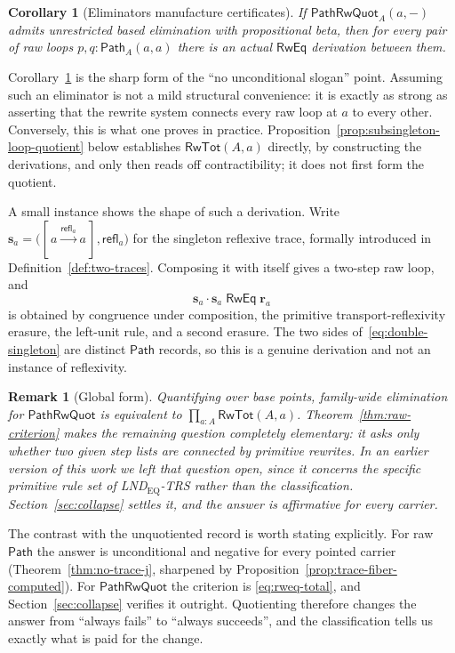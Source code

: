 \documentclass[10pt,reqno]{amsart}
\newtheorem{corollary}[theorem]{Corollary}
\newtheorem{remark}[theorem]{Remark}
\newcommand{\RwTot}{\mathsf{RwTot}}
\newcommand{\PathTy}{\mathsf{Path}}
\newcommand{\refl}{\mathsf{refl}}
\newcommand{\PRW}{\mathsf{PathRwQuot}}
\begin{document}
\begin{corollary}[Eliminators manufacture certificates]
\label{cor:eliminator-certificates}
If \(\PRW_A(a,-)\) admits unrestricted based elimination with propositional
beta, then for every pair of raw loops \(p,q:\PathTy_A(a,a)\) there is an
actual \(\mathsf{RwEq}\) derivation between them.
\end{corollary}

Corollary~\ref{cor:eliminator-certificates} is the sharp form of the ``no
unconditional slogan'' point.  Assuming such an eliminator is not a mild
structural convenience: it is exactly as strong as asserting that the rewrite
system connects every raw loop at \(a\) to every other.  Conversely, this is
what one proves in practice.  Proposition~\ref{prop:subsingleton-loop-quotient}
below establishes \(\RwTot(A,a)\) directly, by constructing the derivations, and
only then reads off contractibility; it does not first form the quotient.

A small instance shows the shape of such a derivation.  Write
\(\mathbf s_a=\bigl([\,a\xrightarrow{\refl_a}a\,],\refl_a\bigr)\) for the
singleton reflexive trace, formally introduced in
Definition~\ref{def:two-traces}.  Composing it with itself gives a two-step raw
loop, and
\[
 \mathbf s_a\cdot\mathbf s_a
 \;\mathrel{\mathsf{RwEq}}\;
 \mathbf r_a
\tag{10.9}\label{eq:double-singleton}
\]
is obtained by congruence under composition, the primitive
transport-reflexivity erasure, the left-unit rule, and a second erasure.  The
two sides of~\eqref{eq:double-singleton} are distinct \(\PathTy\) records, so
this is a genuine derivation and not an instance of reflexivity.

\begin{remark}[Global form]
\label{rem:raw-global}
Quantifying over base points, family-wide elimination for \(\PRW\) is
equivalent to \(\prod_{a:A}\RwTot(A,a)\).  Theorem~\ref{thm:raw-criterion}
makes the remaining question completely elementary: it asks only whether two
given step lists are connected by primitive rewrites.  In an earlier version of
this work we left that question open, since it concerns the specific primitive
rule set of LND\(_{\mathrm{EQ}}\)-TRS rather than the classification.
Section~\ref{sec:collapse} settles it, and the answer is affirmative for every
carrier.
\end{remark}

The contrast with the unquotiented record is worth stating explicitly.  For raw
\(\PathTy\) the answer is unconditional and negative for every pointed carrier
(Theorem~\ref{thm:no-trace-j}, sharpened by
Proposition~\ref{prop:trace-fiber-computed}).  For \(\PRW\) the criterion is
\eqref{eq:rweq-total}, and Section~\ref{sec:collapse} verifies it outright.
Quotienting therefore changes the answer from ``always fails'' to ``always
succeeds'', and the classification tells us exactly what is paid for the
change.
\end{document}
